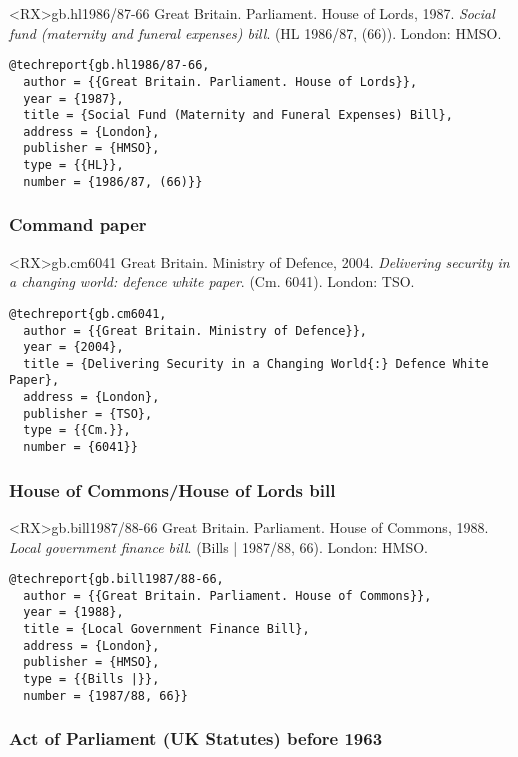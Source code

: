 \documentclass[10pt,a4paper]{article}
\begin{document}
\begin{bibexbox}<RX>{gb.hl1986/87-66}
  Great Britain. Parliament. House of Lords, 1987. \emph{Social fund (maternity and funeral expenses) bill}. (HL 1986/87, (66)). London: HMSO.
  \tcblower
\begin{Verbatim}
@techreport{gb.hl1986/87-66,
  author = {{Great Britain. Parliament. House of Lords}},
  year = {1987},
  title = {Social Fund (Maternity and Funeral Expenses) Bill},
  address = {London},
  publisher = {HMSO},
  type = {{HL}},
  number = {1986/87, (66)}}
\end{Verbatim}
\end{bibexbox}


\subsubsection*{Command paper}

\begin{bibexbox}<RX>{gb.cm6041}
  Great Britain. Ministry of Defence, 2004. \emph{Delivering security in a changing world: defence white paper}. (Cm. 6041). London: TSO.
  \tcblower
\begin{Verbatim}
@techreport{gb.cm6041,
  author = {{Great Britain. Ministry of Defence}},
  year = {2004},
  title = {Delivering Security in a Changing World{:} Defence White Paper},
  address = {London},
  publisher = {TSO},
  type = {{Cm.}},
  number = {6041}}
\end{Verbatim}
\end{bibexbox}


\subsubsection*{House of Commons\slash House of Lords bill}

\begin{bibexbox}<RX>{gb.bill1987/88-66}
  Great Britain. Parliament. House of Commons, 1988. \emph{Local government finance bill}. (Bills | 1987/88, 66). London: HMSO.
  \tcblower
\begin{Verbatim}
@techreport{gb.bill1987/88-66,
  author = {{Great Britain. Parliament. House of Commons}},
  year = {1988},
  title = {Local Government Finance Bill},
  address = {London},
  publisher = {HMSO},
  type = {{Bills |}},
  number = {1987/88, 66}}
\end{Verbatim}
\end{bibexbox}

\subsubsection*{Act of Parliament (UK Statutes) before 1963}
\end{document}
